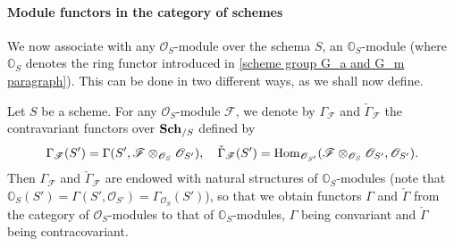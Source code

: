 \paragraph{Module functors in the category of schemes}\label{scheme module Gamma functor paragraph}
We now associate with any $\mathscr{O}_S$-module over the schema $S$, an $\mathbb{O}_S$-module (where $\mathbb{O}_S$ denotes the ring functor introduced in \ref{scheme group G_a and G_m paragraph}). This can be done in two different ways, as we shall now define.
\begin{definition}
Let $S$ be a scheme. For any $\mathscr{O}_S$-module $\mathscr{F}$, we denote by $\Gamma_\mathscr{F}$ and $\check{\Gamma}_\mathscr{F}$ the contravariant functors over $\mathbf{Sch}_{/S}$ defined by
\[\Gamma_\mathscr{F}(S')=\Gamma(S',\mathscr{F}\otimes_{\mathscr{O}_{S}}\mathscr{O}_{S'}),\quad \check{\Gamma}_\mathscr{F}(S')=\mathrm{Hom}_{\mathscr{O}_{S'}}(\mathscr{F}\otimes_{\mathscr{O}_{S}}\mathscr{O}_{S'},\mathscr{O}_{S'}).\]
Then $\Gamma_\mathscr{F}$ and $\check{\Gamma}_\mathscr{F}$ are endowed with natural structures of $\mathbb{O}_S$-modules (note that $\mathbb{O}_S(S')=\Gamma(S',\mathscr{O}_{S'})=\Gamma_{\mathscr{O}_S}(S')$), so that we obtain functors $\Gamma$ and $\check{\Gamma}$ from the category of $\mathscr{O}_S$-modules to that of $\mathbb{O}_S$-modules, $\Gamma$ being convariant and $\check{\Gamma}$ being contracovariant.
\end{definition}

